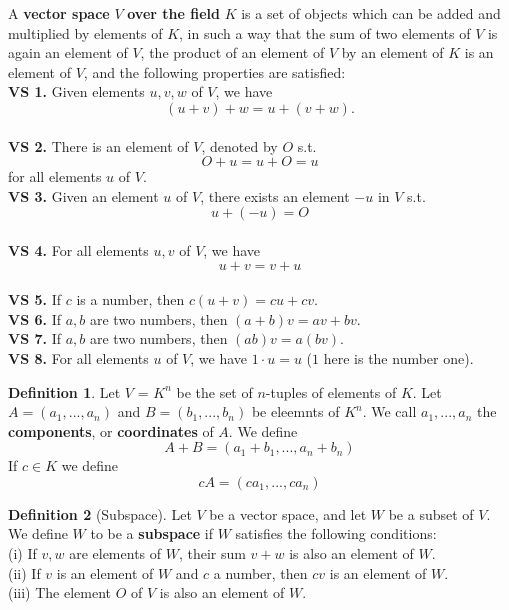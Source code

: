\documentclass{book}
\theoremstyle{definition}
\newtheorem{definition}{Definition}[section]
\begin{document}
A \textbf{vector space} $V$ \textbf{over the field} $K$ is a set of objects which can be added and multiplied by elements of $K$, in such a way that the sum of two elements of $V$ is again an element of $V$, the product of an element of $V$ by an element of $K$ is an element of $V$, and the following properties are satisfied:
\\ \textbf{VS 1.} Given elements $u,v,w$ of $V$, we have 
\begin{equation*}
    (u + v) + w = u + (v + w).
\end{equation*}
\\ \textbf{VS 2.} There is an element of $V$, denoted by $O$ s.t.
\begin{equation*}
    O + u = u + O = u
\end{equation*}
for all elements $u$ of $V$.
\\ \textbf{VS 3.} Given an element $u$ of $V$, there exists an element $-u$ in $V$ s.t.
\begin{equation*}
    u + (-u) = O
\end{equation*}
\\ \textbf{VS 4.} For all elements $u,v$ of $V$, we have
\begin{equation*}
    u + v = v + u
\end{equation*}
\\ \textbf{VS 5.} If $c$ is a number, then $c(u+v)=cu+cv$.
\\ \textbf{VS 6.} If $a,b$ are two numbers, then $(a+b)v = av + bv$.
\\ \textbf{VS 7.} If $a,b$ are two numbers, then $(ab)v = a(bv)$.
\\ \textbf{VS 8.} For all elements $u$ of $V$, we have $1 \cdot u = u$ ($1$ here is the number one).
\begin{definition}
    Let $V$ = $K^n$ be the set of $n$-tuples of elements of $K$. Let $A = (a_1, ..., a_n)$ and $B = (b_1, ..., b_n)$ be eleemnts of $K^n$. We call $a_1, ..., a_n$ the \textbf{components}, or \textbf{coordinates} of $A$. We define
    \begin{equation*}
        A + B = (a_1 + b_1, ..., a_n + b_n)
    \end{equation*}
    If $c \in K$ we define
    \begin{equation*}
        cA = (ca_1, ..., ca_n)
    \end{equation*}
\end{definition}
\begin{definition}[Subspace]
    Let $V$ be a vector space, and let $W$ be a subset of $V$. We define $W$ to be a \textbf{subspace} if $W$ satisfies the following conditions:
    \\(i) If $v,w$ are elements of $W$, their sum $v + w$ is also an element of $W$.
    \\(ii) If $v$ is an element of $W$ and $c$ a number, then $cv$ is an element of $W$.
    \\(iii) The element $O$ of $V$ is also an element of $W$.
\end{definition}
\end{document}
